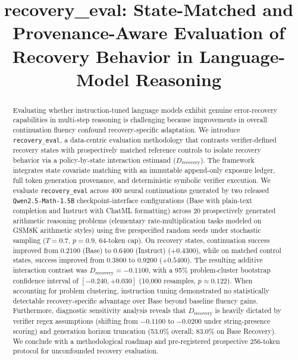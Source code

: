 \documentclass[conference]{IEEEtran}
\begin{document}
\title{recovery\_eval: State-Matched and Provenance-Aware Evaluation of Recovery Behavior in Language-Model Reasoning}

\author{
}

\maketitle

\begin{abstract}
Evaluating whether instruction-tuned language models exhibit genuine error-recovery capabilities in multi-step reasoning is challenging because improvements in overall continuation fluency confound recovery-specific adaptation. We introduce \texttt{recovery\_eval}, a data-centric evaluation methodology that contrasts verifier-defined recovery states with prospectively matched reference controls to isolate recovery behavior via a policy-by-state interaction estimand ($D_{\text{recovery}}$). The framework integrates state covariate matching with an immutable append-only exposure ledger, full token generation provenance, and deterministic symbolic verifier execution. We evaluate \texttt{recovery\_eval} across 400 neural continuations generated by two released \texttt{Qwen2.5-Math-1.5B} checkpoint-interface configurations (Base with plain-text completion and Instruct with ChatML formatting) across 20 prospectively generated arithmetic reasoning problems (elementary rate-multiplication tasks modeled on GSM8K arithmetic styles) using five prespecified random seeds under stochastic sampling ($T=0.7$, $p=0.9$, 64-token cap). On recovery states, continuation success improved from 0.2100 (Base) to 0.6400 (Instruct) ($+0.4300$), while on matched control states, success improved from 0.3800 to 0.9200 ($+0.5400$). The resulting additive interaction contrast was $D_{\text{recovery}} = -0.1100$, with a 95\% problem-cluster bootstrap confidence interval of $[-0.240, +0.030]$ (10,000 resamples, $p \approx 0.122$). When accounting for problem clustering, instruction tuning demonstrated no statistically detectable recovery-specific advantage over Base beyond baseline fluency gains. Furthermore, diagnostic sensitivity analysis reveals that $D_{\text{recovery}}$ is heavily dictated by verifier regex assumptions (shifting from $-0.1100$ to $-0.0200$ under string-presence scoring) and generation horizon truncation (53.0\% overall; 83.0\% on Base Recovery). We conclude with a methodological roadmap and pre-registered prospective 256-token protocol for unconfounded recovery evaluation.
\end{abstract}
\end{document}
